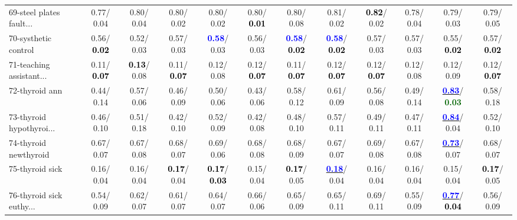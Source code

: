 \begin{table}[h]
\begin{center}
{\begin{tabular}{lc|c|c|c|c|c|c|c|c|c|c}
69-steel plates fault... &   0.77/  0.04 &   0.80/  0.04 &   0.80/  0.02 &   0.80/  0.02 &   0.80/\textcolor{black}{\textbf{  0.01}} &   0.80/  0.08 &   0.81/  0.02 & \textcolor{black}{\textbf{  0.82}}/  0.02 &   0.78/  0.04 &   0.79/  0.03 &   0.79/  0.05 \\
70-systhetic control &   0.56/\textcolor{black}{\textbf{  0.02}} &   0.52/  0.03 &   0.57/  0.03 & \textcolor{blue}{\textbf{  0.58}}/  0.03 &   0.56/  0.03 & \textcolor{blue}{\textbf{  0.58}}/\textcolor{black}{\textbf{  0.02}} & \textcolor{blue}{\textbf{  0.58}}/\textcolor{black}{\textbf{  0.02}} &   0.57/  0.03 &   0.57/  0.03 &   0.55/\textcolor{black}{\textbf{  0.02}} &   0.57/\textcolor{black}{\textbf{  0.02}} \\
71-teaching assistant... &   0.11/\textcolor{black}{\textbf{  0.07}} & \textcolor{black}{\textbf{  0.13}}/  0.08 &   0.11/\textcolor{black}{\textbf{  0.07}} &   0.12/  0.08 &   0.12/\textcolor{black}{\textbf{  0.07}} &   0.11/\textcolor{black}{\textbf{  0.07}} &   0.12/\textcolor{black}{\textbf{  0.07}} &   0.12/\textcolor{black}{\textbf{  0.07}} &   0.12/  0.08 &   0.12/  0.09 &   0.12/\textcolor{black}{\textbf{  0.07}} \\ \hline
72-thyroid ann &   0.44/  0.14 &   0.57/  0.06 &   0.46/  0.09 &   0.50/  0.06 &   0.43/  0.06 &   0.58/  0.12 &   0.61/  0.09 &   0.56/  0.08 &   0.49/  0.14 & \underline{\textcolor{blue}{\textbf{  0.83}}}/\textcolor{darkgreen}{\textbf{  0.03}} &   0.58/  0.18 \\
73-thyroid hypothyroi... &   0.46/  0.10 &   0.51/  0.18 &   0.42/  0.10 &   0.52/  0.09 &   0.42/  0.08 &   0.48/  0.10 &   0.57/  0.11 &   0.49/  0.11 &   0.47/  0.11 & \underline{\textcolor{blue}{\textbf{  0.84}}}/  0.04 &   0.52/  0.10 \\
74-thyroid newthyroid &   0.67/  0.07 &   0.67/  0.08 &   0.68/  0.07 &   0.69/  0.06 &   0.68/  0.08 &   0.68/  0.09 &   0.67/  0.07 &   0.69/  0.08 &   0.67/  0.08 & \underline{\textcolor{blue}{\textbf{  0.73}}}/  0.07 &   0.68/  0.07 \\
75-thyroid sick &   0.16/  0.04 &   0.16/  0.04 & \textcolor{black}{\textbf{  0.17}}/  0.04 & \textcolor{black}{\textbf{  0.17}}/\textcolor{black}{\textbf{  0.03}} &   0.15/  0.04 & \textcolor{black}{\textbf{  0.17}}/  0.05 & \underline{\textcolor{blue}{\textbf{  0.18}}}/  0.04 &   0.16/  0.04 &   0.16/  0.04 &   0.15/  0.04 & \textcolor{black}{\textbf{  0.17}}/  0.05 \\
76-thyroid sick euthy... &   0.54/  0.09 &   0.62/  0.07 &   0.61/  0.07 &   0.64/  0.07 &   0.66/  0.06 &   0.65/  0.09 &   0.65/  0.11 &   0.69/  0.11 &   0.55/  0.09 & \underline{\textcolor{blue}{\textbf{  0.77}}}/\textcolor{black}{\textbf{  0.04}} &   0.56/  0.09 \\

\end{tabular}}
\end{center}
\end{table}
